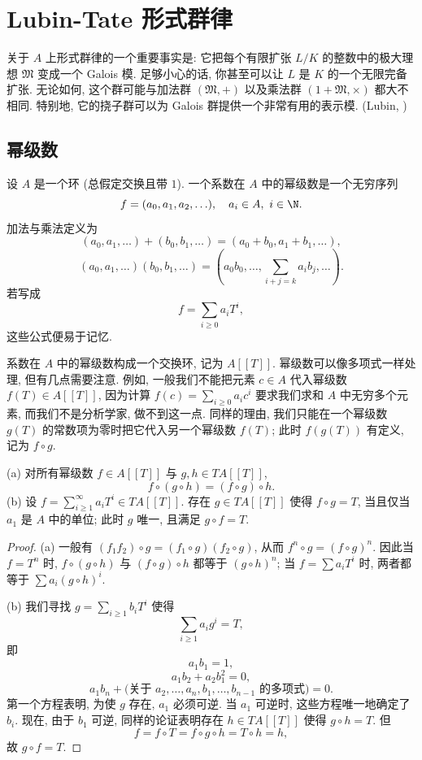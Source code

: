 \section{Lubin-Tate 形式群律}\label{sec:I.2}

关于 $A$ 上形式群律的一个重要事实是: 它把每个有限扩张 $L/K$ 的整数中的极大理想 $\mathfrak{M}$ 变成一个 Galois 模. 足够小心的话, 你甚至可以让 $L$ 是 $K$ 的一个无限完备扩张. 无论如何, 这个群可能与加法群 $(\mathfrak{M},+)$ 以及乘法群 $(1+\mathfrak{M},\times)$ 都大不相同. 特别地, 它的挠子群可以为 Galois 群提供一个非常有用的表示模. (Lubin, )

\subsection*{幂级数}

设 $A$ 是一个环 (总假定交换且带 $1$). 一个系数在 $A$ 中的幂级数是一个无穷序列
\[
f=(a_0,a_1,a_2,\ldots),\quad a_i\in A,\ i\in\N.
\]
加法与乘法定义为
\[
(a_0,a_1,\ldots)+(b_0,b_1,\ldots)=(a_0+b_0,a_1+b_1,\ldots),
\]
\[
(a_0,a_1,\ldots)(b_0,b_1,\ldots)=(a_0b_0,\ldots,\textstyle\sum_{i+j=k}a_i b_j,\ldots).
\]
若写成
\[
f=\sum_{i\ge 0}a_i T^i,
\]
这些公式便易于记忆.

系数在 $A$ 中的幂级数构成一个交换环, 记为 $A[[T]]$. 幂级数可以像多项式一样处理, 但有几点需要注意. 例如, 一般我们不能把元素 $c\in A$ 代入幂级数 $f(T)\in A[[T]]$, 因为计算 $f(c)=\sum_{i\ge 0}a_i c^i$ 要求我们求和 $A$ 中无穷多个元素, 而我们不是分析学家, 做不到这一点. 同样的理由, 我们只能在一个幂级数 $g(T)$ 的常数项为零时把它代入另一个幂级数 $f(T)$; 此时 $f(g(T))$ 有定义, 记为 $f\circ g$.

\begin{lemma}\label{lem:2.1}
(a) 对所有幂级数 $f\in A[[T]]$ 与 $g,h\in TA[[T]]$,
\[
f\circ(g\circ h)=(f\circ g)\circ h.
\]
(b) 设 $f=\sum_{i\ge 1}^{\infty}a_i T^i\in TA[[T]]$. 存在 $g\in TA[[T]]$ 使得 $f\circ g=T$, 当且仅当 $a_1$ 是 $A$ 中的单位; 此时 $g$ 唯一, 且满足 $g\circ f=T$.
\end{lemma}

\begin{proof}
(a) 一般有 $(f_1f_2)\circ g=(f_1\circ g)(f_2\circ g)$, 从而 $f^n\circ g=(f\circ g)^n$. 因此当 $f=T^n$ 时, $f\circ(g\circ h)$ 与 $(f\circ g)\circ h$ 都等于 $(g\circ h)^n$; 当 $f=\sum a_i T^i$ 时, 两者都等于 $\sum a_i(g\circ h)^i$.

(b) 我们寻找 $g=\sum_{i\ge 1}b_i T^i$ 使得
\[
\sum_{i\ge 1}a_i g^i=T,
\]
即
\[
a_1b_1=1,
\]
\[
a_1b_2+a_2b_1^2=0,
\]
\[
a_1b_n+\bigl(\text{关于 }a_2,\ldots,a_n,b_1,\ldots,b_{n-1}\text{ 的多项式}\bigr)=0.
\]
第一个方程表明, 为使 $g$ 存在, $a_1$ 必须可逆. 当 $a_1$ 可逆时, 这些方程唯一地确定了 $b_i$. 现在, 由于 $b_1$ 可逆, 同样的论证表明存在 $h\in TA[[T]]$ 使得 $g\circ h=T$. 但
\[
f=f\circ T=f\circ g\circ h=T\circ h=h,
\]
故 $g\circ f=T$.
\end{proof}

